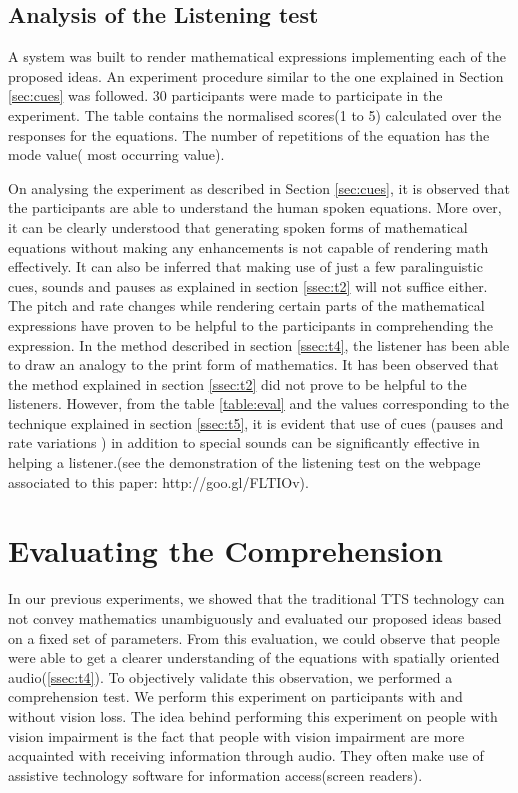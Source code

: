 \documentclass{article}
\begin{document}
\subsection{Analysis of the Listening test}
\label{ssec:ideaseval}


A system was built to render mathematical expressions implementing each of the proposed ideas. An experiment procedure similar to the one explained in Section \ref{sec:cues} was followed. 30 participants were made to participate in the experiment. The table contains the normalised scores(1 to 5) calculated over the responses for the equations. The number of repetitions of the equation has the  mode value( most occurring value).

On analysing the experiment as described in Section \ref{sec:cues}, it is observed that the participants are able to understand the human spoken equations. More over, it can be clearly understood that generating spoken forms of mathematical equations without making any enhancements is not capable of rendering math effectively. It can also be inferred that making use of just  a few paralinguistic cues, sounds and pauses as explained in section \ref{ssec:t2} will not suffice either. The pitch and rate changes while rendering certain parts of the mathematical expressions have proven to be helpful to the participants in comprehending the expression. In the method described in section \ref{ssec:t4}, the listener has been able to draw an analogy to the print form of mathematics. It has been observed that the method explained in section \ref{ssec:t2} did not prove to be helpful to the listeners. However, from the table \ref{table:eval} and the values corresponding to the technique explained in section \ref{ssec:t5}, it is evident that use of  cues (pauses and rate variations ) in addition to special sounds can be significantly effective in helping a listener.(see the demonstration of the listening test on the webpage associated to this paper: http://goo.gl/FLTIOv).

\section{Evaluating the Comprehension}
\label{sec:comprehension}

In our previous experiments, we showed that the traditional TTS technology can not convey mathematics unambiguously and evaluated our proposed ideas based on a fixed set of parameters. From this evaluation, we could observe that people were able to get a clearer understanding of the equations with spatially oriented audio(\ref{ssec:t4}). To objectively validate this observation, we performed a comprehension test.  We perform this experiment on participants with and without vision loss. The idea behind performing this experiment on people with vision impairment is the fact that people with vision impairment are more acquainted with receiving information through audio. They often make use of assistive technology software for information access(screen readers).
\end{document}
